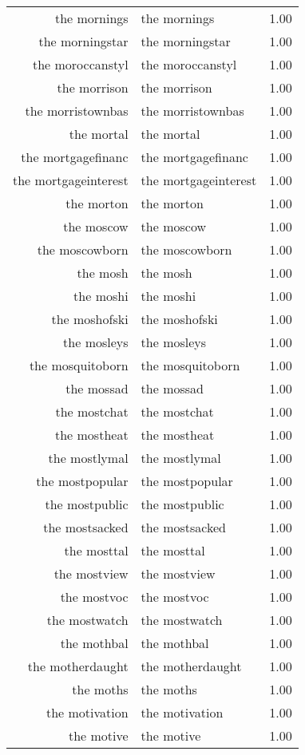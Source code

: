 \begin{table}[ht]
\begin{tabular}{rlr}
  the mornings & the mornings & 1.00 \\ 
  the morningstar & the morningstar & 1.00 \\ 
  the moroccanstyl & the moroccanstyl & 1.00 \\ 
  the morrison & the morrison & 1.00 \\ 
  the morristownbas & the morristownbas & 1.00 \\ 
  the mortal & the mortal & 1.00 \\ 
  the mortgagefinanc & the mortgagefinanc & 1.00 \\ 
  the mortgageinterest & the mortgageinterest & 1.00 \\ 
  the morton & the morton & 1.00 \\ 
  the moscow & the moscow & 1.00 \\ 
  the moscowborn & the moscowborn & 1.00 \\ 
  the mosh & the mosh & 1.00 \\ 
  the moshi & the moshi & 1.00 \\ 
  the moshofski & the moshofski & 1.00 \\ 
  the mosleys & the mosleys & 1.00 \\ 
  the mosquitoborn & the mosquitoborn & 1.00 \\ 
  the mossad & the mossad & 1.00 \\ 
  the mostchat & the mostchat & 1.00 \\ 
  the mostheat & the mostheat & 1.00 \\ 
  the mostlymal & the mostlymal & 1.00 \\ 
  the mostpopular & the mostpopular & 1.00 \\ 
  the mostpublic & the mostpublic & 1.00 \\ 
  the mostsacked & the mostsacked & 1.00 \\ 
  the mosttal & the mosttal & 1.00 \\ 
  the mostview & the mostview & 1.00 \\ 
  the mostvoc & the mostvoc & 1.00 \\ 
  the mostwatch & the mostwatch & 1.00 \\ 
  the mothbal & the mothbal & 1.00 \\ 
  the motherdaught & the motherdaught & 1.00 \\ 
  the moths & the moths & 1.00 \\ 
  the motivation & the motivation & 1.00 \\ 
  the motive & the motive & 1.00 \\ 

\end{tabular}
\end{table}
